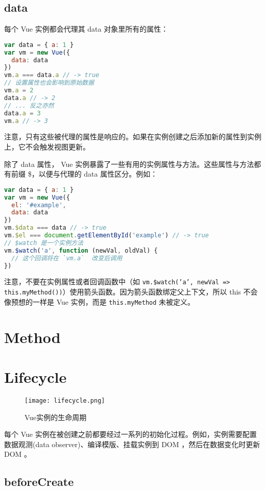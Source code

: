 \subsection{data}

每个 Vue 实例都会代理其 data 对象里所有的属性：

\begin{lstlisting}[language=JavaScript]
var data = { a: 1 }
var vm = new Vue({
  data: data
})
vm.a === data.a // -> true
// 设置属性也会影响到原始数据
vm.a = 2
data.a // -> 2
// ... 反之亦然
data.a = 3
vm.a // -> 3
\end{lstlisting}

注意，只有这些被代理的属性是响应的。如果在实例创建之后添加新的属性到实例上，它不会触发视图更新。

除了 data 属性， Vue 实例暴露了一些有用的实例属性与方法。这些属性与方法都有前缀 \$，以便与代理的 data 属性区分。例如：

\begin{lstlisting}[language=JavaScript]
var data = { a: 1 }
var vm = new Vue({
  el: '#example',
  data: data
})
vm.$data === data // -> true
vm.$el === document.getElementById('example') // -> true
// $watch 是一个实例方法
vm.$watch('a', function (newVal, oldVal) {
  // 这个回调将在 `vm.a`  改变后调用
})
\end{lstlisting}

注意，不要在实例属性或者回调函数中（如 \texttt{vm.\$watch('a', newVal => this.myMethod())}）使用箭头函数。因为箭头函数绑定父上下文，所以 this 不会像预想的一样是 Vue 实例，而是 \texttt{this.myMethod} 未被定义。

\section{Method}


\section{Lifecycle}

\begin{figure}[htbp]
\centering
\texttt{[image: lifecycle.png]}
\caption{Vue实例的生命周期}
\end{figure}

每个 Vue 实例在被创建之前都要经过一系列的初始化过程。例如，实例需要配置数据观测(data observer)、编译模版、挂载实例到 DOM ，然后在数据变化时更新 DOM 。


\subsection{beforeCreate}


